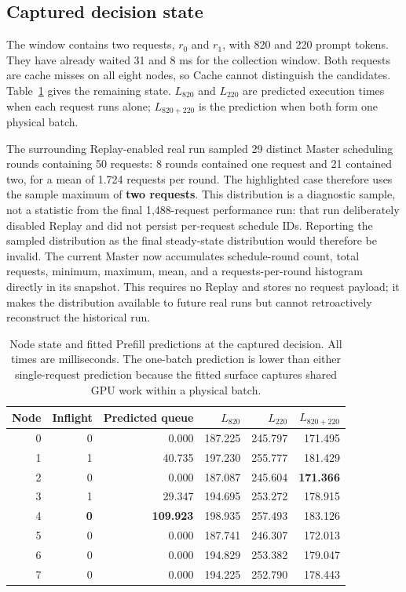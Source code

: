 \documentclass[10pt]{article}
\newcommand{\keydata}[1]{\textcolor{green!40!black}{\textbf{#1}}}
\newcommand{\alertdata}[1]{\textcolor{red!70!black}{\textbf{#1}}}
\begin{document}
\subsection{Captured decision state}

The window contains two requests, $r_0$ and $r_1$, with 820 and 220 prompt
tokens. They have already waited 31 and 8 ms for the collection window. Both
requests are cache misses on all eight nodes, so Cache cannot distinguish the
candidates. Table~\ref{tab:decision-node-state} gives the remaining state.
$L_{820}$ and $L_{220}$ are predicted execution times when each request runs
alone; $L_{820+220}$ is the prediction when both form one physical batch.

The surrounding Replay-enabled real run sampled 29 distinct Master scheduling
rounds containing 50 requests: 8 rounds contained one request and 21 contained
two, for a mean of 1.724 requests per round. The highlighted case therefore
uses the sample maximum of \keydata{two requests}. This distribution is a
diagnostic sample, not a statistic from the final 1,488-request performance
run: that run deliberately disabled Replay and did not persist per-request
schedule IDs. Reporting the sampled distribution as the final steady-state
distribution would therefore be invalid. The current Master now accumulates
schedule-round count, total requests, minimum, maximum, mean, and a
requests-per-round histogram directly in its snapshot. This requires no
Replay and stores no request payload; it makes the distribution available to
future real runs but cannot retroactively reconstruct the historical run.

\begin{table}[t]
\centering
\small
\caption{Node state and fitted Prefill predictions at the captured decision.
All times are milliseconds. The one-batch prediction is lower than either
single-request prediction because the fitted surface captures shared GPU
work within a physical batch.}
\label{tab:decision-node-state}
\begin{tabular}{rrrrrr}
\toprule
Node & Inflight & Predicted queue & $L_{820}$ & $L_{220}$ & $L_{820+220}$ \\
\midrule
0 & 0 & 0.000 & 187.225 & 245.797 & 171.495 \\
1 & 1 & 40.735 & 197.230 & 255.777 & 181.429 \\
2 & 0 & 0.000 & 187.087 & 245.604 & \keydata{171.366} \\
3 & 1 & 29.347 & 194.695 & 253.272 & 178.915 \\
4 & \alertdata{0} & \alertdata{109.923} & 198.935 & 257.493 & 183.126 \\
5 & 0 & 0.000 & 187.741 & 246.307 & 172.013 \\
6 & 0 & 0.000 & 194.829 & 253.382 & 179.047 \\
7 & 0 & 0.000 & 194.225 & 252.790 & 178.443 \\
\bottomrule
\end{tabular}
\end{table}
\end{document}
